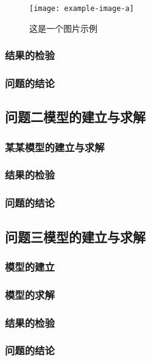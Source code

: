 \documentclass{ctexart}
\begin{document}
    \begin{figure}[H] %
        \centering %
        \texttt{[image: example-image-a]} %
        \caption{这是一个图片示例} %
        \label{fig:example} %
    \end{figure}


    
    \subsubsection{结果的检验}
    \subsubsection{问题的结论}
    \subsection{问题二模型的建立与求解}
    
    \subsubsection{某某模型的建立与求解}

    \subsubsection{结果的检验}
    \subsubsection{问题的结论}
    \subsection{问题三模型的建立与求解}
    \subsubsection{模型的建立}
    \subsubsection{模型的求解}
    \subsubsection{结果的检验}
    \subsubsection{问题的结论}
\end{document}
